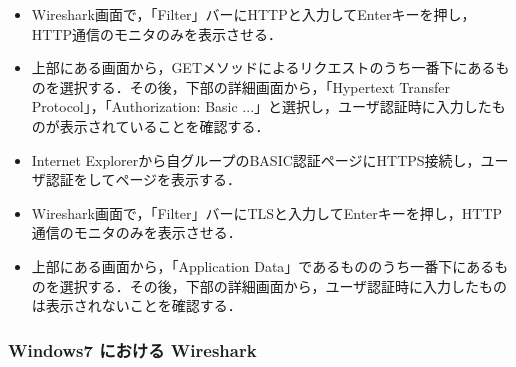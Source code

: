 \documentclass[a4j,titlepage]{jarticle}
\begin{document}
\begin{enumerate}
\begin{itemize}
\item Wireshark画面で，「Filter」バーにHTTPと入力してEnterキーを押し，HTTP通信のモニタのみを表示させる．

\item 上部にある画面から，GETメソッドによるリクエストのうち一番下にあるものを選択する．その後，下部の詳細画面から，「Hypertext Transfer Protocol」，「Authorization: Basic ...」と選択し，ユーザ認証時に入力したものが表示されていることを確認する．

\item Internet Explorerから自グループのBASIC認証ページにHTTPS接続し，ユーザ認証をしてページを表示する．

\item Wireshark画面で，「Filter」バーにTLSと入力してEnterキーを押し，HTTP通信のモニタのみを表示させる．

\item 上部にある画面から，「Application Data」であるもののうち一番下にあるものを選択する．その後，下部の詳細画面から，ユーザ認証時に入力したものは表示されないことを確認する．
\end{itemize}
\end{enumerate}



\subsubsection{Windows7 における Wireshark}
\end{document}
